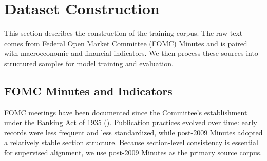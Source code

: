 \newcommand{\inputtag}[1]{**\textless #1\textgreater**}



\section{Dataset Construction}\label{ch2:sec:the-dataset}

This section describes the construction of the training corpus. The raw text comes from Federal Open Market Committee (FOMC) Minutes and is paired with macroeconomic and financial indicators. We then process these sources into structured samples for model training and evaluation.


\subsection*{FOMC Minutes and Indicators}\label{ch2:sec:raw_data}

FOMC meetings have been documented since the Committee's establishment under the Banking Act of 1935 (\cite{todd2016corollary}). Publication practices evolved over time: early records were less frequent and less standardized, while post-2009 Minutes adopted a relatively stable section structure. Because section-level consistency is essential for supervised alignment, we use post-2009 Minutes as the primary source corpus.



